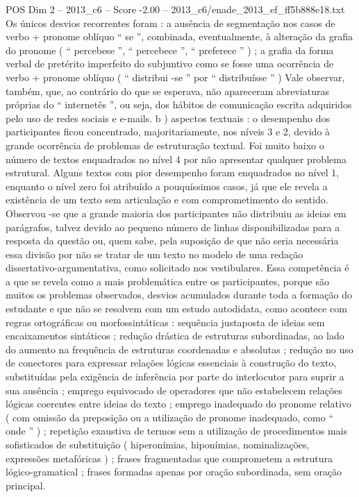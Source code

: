 \begin{textsample}{POS Dim 2 – 2013\_c6 – Score -2.00 – 2013\_c6/enade\_2013\_ef\_ff5b888e18.txt}
Os únicos desvios recorrentes foram : a ausência de segmentação nos casos de verbo + pronome oblíquo “ se ”, combinada, eventualmente, à alteração da grafia do pronome ( “ percebese ”, “ percebece ”, “ preferece ” ) ; a grafia da forma verbal de pretérito imperfeito do subjuntivo como se fosse uma ocorrência de verbo + pronome oblíquo ( “ distribui -se ” por “ distribuísse ” ) Vale observar, também, que, ao contrário do que se esperava, não apareceram abreviaturas próprias do “ internetês ”, ou seja, dos hábitos de comunicação escrita adquiridos pelo uso de redes sociais e e-mails. b ) aspectos textuais : o desempenho dos participantes ficou concentrado, majoritariamente, nos níveis 3 e 2, devido à grande ocorrência de problemas de estruturação textual.
Foi muito baixo o número de textos enquadrados no nível 4 por não apresentar qualquer problema estrutural.
Alguns textos com pior desempenho foram enquadrados no nível 1, enquanto o nível zero foi atribuído a pouquíssimos casos, já que ele revela a existência de um texto sem articulação e com comprometimento do sentido.
Observou -se que a grande maioria dos participantes não distribuiu as ideias em parágrafos, talvez devido ao pequeno número de linhas disponibilizadas para a resposta da questão ou, quem sabe, pela suposição de que não seria necessária essa divisão por não se tratar de um texto no modelo de uma redação dissertativo-argumentativa, como solicitado nos vestibulares.
Essa competência é a que se revela como a mais problemática entre os participantes, porque são muitos os problemas observados, desvios acumulados durante toda a formação do estudante e que não se resolvem com um estudo autodidata, como acontece com regras ortográficas ou morfossintáticas : sequência justaposta de ideias sem encaixamentos sintáticos ; redução drástica de estruturas subordinadas, ao lado do aumento na frequência de estruturas coordenadas e absolutas ; redução no uso de conectores para expressar relações lógicas essenciais à construção do texto, substituídas pela exigência de inferência por parte do interlocutor para suprir a sua ausência ; emprego equivocado de operadores que não estabelecem relações lógicas coerentes entre ideias do texto ; emprego inadequado do pronome relativo ( com omissão da preposição ou a utilização de pronome inadequado, como “ onde ” ) ; repetição exaustiva de termos sem a utilização de procedimentos mais sofisticados de substituição ( hiperonímias, hiponímias, nominalizações, expressões metafóricas ) ; frases fragmentadas que comprometem a estrutura lógico-gramatical ; frases formadas apenas por oração subordinada, sem oração principal.

\end{textsample}
